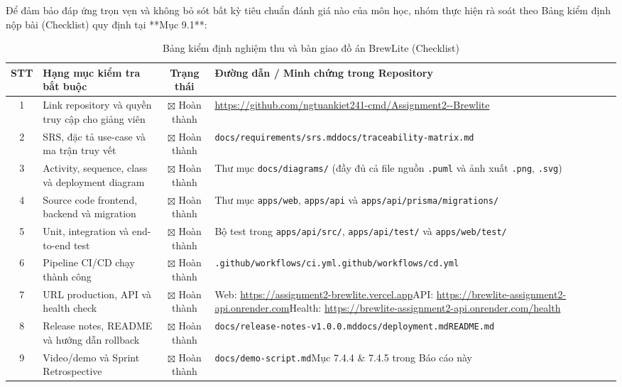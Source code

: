 \documentclass[a4paper]{article}
\begin{document}
Để đảm bảo đáp ứng trọn vẹn và không bỏ sót bất kỳ tiêu chuẩn đánh giá nào của môn học, nhóm thực hiện rà soát theo Bảng kiểm định nộp bài (Checklist) quy định tại **Mục 9.1**:

\begin{table}[H]
\centering
\begin{tabularx}{\textwidth}{|c|X|c|m{4.8cm}|}
\hline
\textbf{STT} & \textbf{Hạng mục kiểm tra bắt buộc} & \textbf{Trạng thái} & \textbf{Đường dẫn / Minh chứng trong Repository} \\
\hline
1 & Link repository và quyền truy cập cho giảng viên & $\boxtimes$ Hoàn thành & \url{https://github.com/ngtuankiet241-cmd/Assignment2--Brewlite} \\
\hline
2 & SRS, đặc tả use-case và ma trận truy vết & $\boxtimes$ Hoàn thành & \texttt{docs/requirements/srs.md}\newline\texttt{docs/traceability-matrix.md} \\
\hline
3 & Activity, sequence, class và deployment diagram & $\boxtimes$ Hoàn thành & Thư mục \texttt{docs/diagrams/} (đầy đủ cả file nguồn \texttt{.puml} và ảnh xuất \texttt{.png}, \texttt{.svg}) \\
\hline
4 & Source code frontend, backend và migration & $\boxtimes$ Hoàn thành & Thư mục \texttt{apps/web}, \texttt{apps/api} và \texttt{apps/api/prisma/migrations/} \\
\hline
5 & Unit, integration và end-to-end test & $\boxtimes$ Hoàn thành & Bộ test trong \texttt{apps/api/src/}, \texttt{apps/api/test/} và \texttt{apps/web/test/} \\
\hline
6 & Pipeline CI/CD chạy thành công & $\boxtimes$ Hoàn thành & \texttt{.github/workflows/ci.yml}\newline\texttt{.github/workflows/cd.yml} \\
\hline
7 & URL production, API và health check & $\boxtimes$ Hoàn thành & Web: \url{https://assignment2-brewlite.vercel.app}\newline API: \url{https://brewlite-assignment2-api.onrender.com}\newline Health: \url{https://brewlite-assignment2-api.onrender.com/health} \\
\hline
8 & Release notes, README và hướng dẫn rollback & $\boxtimes$ Hoàn thành & \texttt{docs/release-notes-v1.0.0.md}\newline\texttt{docs/deployment.md}\newline\texttt{README.md} \\
\hline
9 & Video/demo và Sprint Retrospective & $\boxtimes$ Hoàn thành & \texttt{docs/demo-script.md}\newline Mục 7.4.4 \& 7.4.5 trong Báo cáo này \\
\hline
\end{tabularx}
\caption{Bảng kiểm định nghiệm thu và bàn giao đồ án BrewLite (Checklist)}
\label{tab:checklist}
\end{table}
\end{document}

